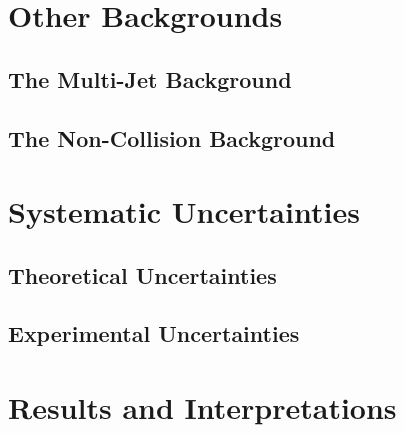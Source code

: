 \documentclass[10pt,twoside,cucitura,classica,english,openany]{toptesi}
\begin{document}


\section{Other Backgrounds}
\label{sec:other-backgrounds}

\subsection{The Multi-Jet Background}
\label{sec:multi-jet-background}



\subsection{The Non-Collision Background}
\label{sec:non-coll-backgr}



\section{Systematic Uncertainties}
\label{sec:syst-uncert}



\subsection{Theoretical Uncertainties}
\label{sec:theor-uncert}



\subsection{Experimental Uncertainties}
\label{sec:exper-uncert}



\section{Results and Interpretations}
\label{sec:results}



\end{document}
